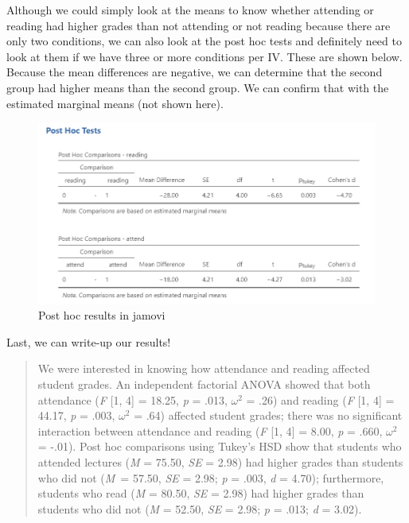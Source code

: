 \documentclass[
]{book}
\begin{document}
Although we could simply look at the means to know whether attending or reading had higher grades than not attending or not reading because there are only two conditions, we can also look at the post hoc tests and definitely need to look at them if we have three or more conditions per IV. These are shown below. Because the mean differences are negative, we can determine that the second group had higher means than the second group. We can confirm that with the estimated marginal means (not shown here).

\begin{figure}

{\centering \includegraphics[width=1\linewidth]{images/06-factorial-anova/independent-factorial_posthoc} 

}

\caption{Post hoc results in jamovi}\label{fig:unnamed-chunk-3}
\end{figure}

Last, we can write-up our results!

\begin{quote}
We were interested in knowing how attendance and reading affected student grades. An independent factorial ANOVA showed that both attendance (\emph{F} {[}1, 4{]} = 18.25, \emph{p} = .013, \(\omega^2\) = .26) and reading (\emph{F} {[}1, 4{]} = 44.17, \emph{p} = .003, \(\omega^2\) = .64) affected student grades; there was no significant interaction between attendance and reading (\emph{F} {[}1, 4{]} = 8.00, \emph{p} = .660, \(\omega^2\) = -.01). Post hoc comparisons using Tukey's HSD show that students who attended lectures (\emph{M} = 75.50, \emph{SE} = 2.98) had higher grades than students who did not (\emph{M}~= 57.50, \emph{SE} = 2.98; \emph{p} = .003, \emph{d} = 4.70); furthermore, students who read (\emph{M} = 80.50, \emph{SE} = 2.98) had higher grades than students who did not (\emph{M} = 52.50, \emph{SE} = 2.98; \emph{p} = .013; \emph{d} = 3.02).
\end{quote}
\end{document}
